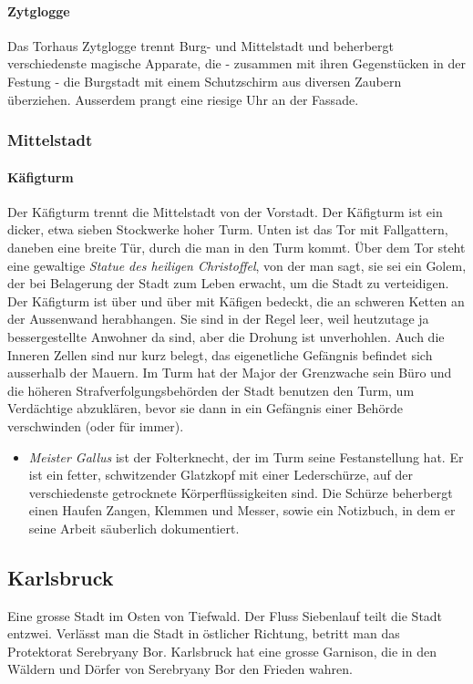 \documentclass[12pt,twoside,twocolumn,openany]{book}
\begin{document}
\paragraph{Zytglogge} Das Torhaus Zytglogge trennt Burg- und Mittelstadt und beherbergt verschiedenste magische Apparate, die - zusammen mit ihren Gegenstücken in der Festung - die Burgstadt mit einem Schutzschirm aus diversen Zaubern überziehen. Ausserdem prangt eine riesige Uhr an der Fassade.

\subsubsection{Mittelstadt}

\paragraph{Käfigturm} Der Käfigturm trennt die Mittelstadt von der Vorstadt. Der Käfigturm ist ein dicker, etwa sieben Stockwerke hoher Turm. Unten ist das Tor mit Fallgattern, daneben eine breite Tür, durch die man in den Turm kommt. Über dem Tor steht eine gewaltige \emph{Statue des heiligen Christoffel}, von der man sagt, sie sei ein Golem, der bei Belagerung der Stadt zum Leben erwacht, um die Stadt zu verteidigen. Der Käfigturm ist über und über mit Käfigen bedeckt, die an schweren Ketten an der Aussenwand herabhangen. Sie sind in der Regel leer, weil heutzutage ja bessergestellte Anwohner da sind, aber die Drohung ist unverhohlen. Auch die Inneren Zellen sind nur kurz belegt, das eigenetliche Gefängnis befindet sich ausserhalb der Mauern.
Im Turm hat der Major der Grenzwache sein Büro und die höheren Strafverfolgungsbehörden der Stadt benutzen den Turm, um Verdächtige abzuklären, bevor sie dann in ein Gefängnis einer Behörde verschwinden (oder für immer).
\begin{itemize}
	\item \textit{Meister Gallus} ist der Folterknecht, der im Turm seine Festanstellung hat. Er ist ein fetter, schwitzender Glatzkopf mit einer Lederschürze, auf der verschiedenste getrocknete Körperflüssigkeiten sind. Die Schürze beherbergt einen Haufen Zangen, Klemmen und Messer, sowie ein Notizbuch, in dem er seine Arbeit säuberlich dokumentiert.
\end{itemize}

\subsection{Karlsbruck}
Eine grosse Stadt im Osten von Tiefwald. Der Fluss Siebenlauf teilt die Stadt entzwei. Verlässt man die Stadt in östlicher Richtung, betritt man das Protektorat Serebryany Bor. Karlsbruck hat eine grosse Garnison, die in den Wäldern und Dörfer von Serebryany Bor den Frieden wahren.
\end{document}
